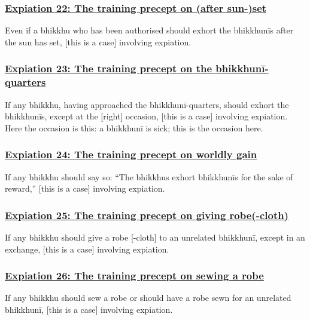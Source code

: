 \subsubsection*{\hyperref[pac22]{Expiation 22: The training precept on (after sun-)set}}
\label{exp22}
Even if a bhikkhu who has been authorised should exhort the bhikkhunīs after the sun has set, [this is a case] involving expiation.



\subsubsection*{\hyperref[pac23]{Expiation 23: The training precept on the bhikkhunī-quarters}}
\label{exp23}
If any bhikkhu, having approached the bhikkhunī-quarters, should exhort the bhikkhunīs, except at the [right] occasion, [this is a case] involving expiation. Here the occasion is this: a bhikkhunī is sick; this is the occasion here.



\subsubsection*{\hyperref[pac24]{Expiation 24: The training precept on worldly gain}}
\label{exp24}
If any bhikkhu should say so: ``The bhikkhus exhort bhikkhunīs for the sake of reward,'' [this is a case] involving expiation.



\subsubsection*{\hyperref[pac25]{Expiation 25: The training precept on giving robe(-cloth)}}
\label{exp25}
If any bhikkhu should give a robe [-cloth] to an unrelated bhikkhunī, except in an exchange, [this is a case] involving expiation.



\subsubsection*{\hyperref[pac26]{Expiation 26: The training precept on sewing a robe}}
\label{exp26}
If any bhikkhu should sew a robe or should have a robe sewn for an unrelated bhikkhunī, [this is a case] involving expiation.



